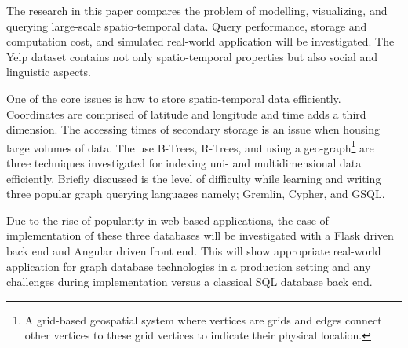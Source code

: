 The research in this paper compares the problem of modelling, visualizing, and querying large-scale spatio-temporal data. Query performance, storage and computation cost, and simulated real-world application will be investigated. The Yelp dataset contains not only spatio-temporal properties but also social and linguistic aspects.

One of the core issues is how to store spatio-temporal data efficiently. Coordinates are comprised of latitude and longitude and time adds a third dimension. The accessing times of secondary storage is an issue when housing large volumes of data. The use B-Trees, R-Trees, and using a geo-graph\footnote{A grid-based geospatial system where vertices are grids and edges connect other vertices to these grid vertices to indicate their physical location.} are three techniques investigated for indexing uni- and multidimensional data efficiently. Briefly discussed is the level of difficulty while learning and writing three popular graph querying languages namely; Gremlin, Cypher, and GSQL.

Due to the rise of popularity in web-based applications, the ease of implementation of these three databases will be investigated with a Flask \cite{flask} driven back end and Angular \cite{angular} driven front end. This will show appropriate real-world application for graph database technologies in a production setting and any challenges during implementation versus a classical SQL database back end.
